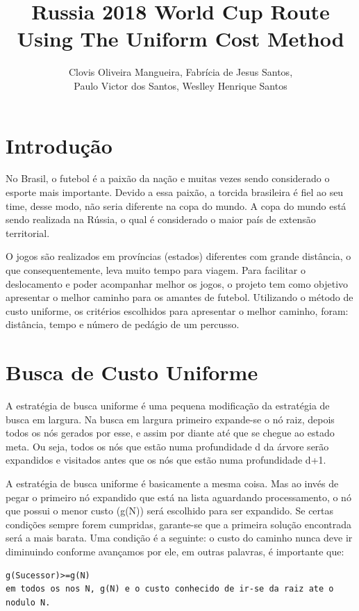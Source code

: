 \documentclass[12pt]{article}
\title{Russia 2018 World Cup Route Using The Uniform Cost Method}
\author{Clovis Oliveira Mangueira\inst{1}, Fabrícia de Jesus Santos\inst{1}, \\ Paulo Victor dos Santos\inst{1}, 	Weslley Henrique Santos\inst{1}}
\begin{document}
 

\maketitle

\section{Introdução}
No Brasil, o futebol é a paixão da nação e muitas vezes sendo considerado o esporte mais importante. Devido a essa paixão, a torcida brasileira é fiel ao seu time, desse modo, não seria diferente na copa do mundo. A copa do mundo está sendo realizada na Rússia, o qual é considerado o maior país de extensão territorial. 

O jogos são realizados em províncias (estados) diferentes com grande distância, o que consequentemente, leva muito tempo para viagem. Para facilitar o deslocamento e poder acompanhar melhor os jogos, o projeto tem como objetivo apresentar o melhor caminho para os amantes de futebol. Utilizando o método de custo uniforme, os critérios escolhidos para apresentar o melhor caminho, foram: distância, tempo e número de pedágio de um percusso.
\section{Busca de Custo Uniforme}
A estratégia de busca uniforme é uma pequena modificação da estratégia de busca em largura. Na busca em largura primeiro expande-se o nó raiz, depois todos os nós gerados por esse, e assim por diante até que se chegue ao estado meta. Ou seja, todos os nós que estão numa profundidade d da árvore serão expandidos e visitados antes que os nós que estão numa profundidade d+1.

A estratégia de busca uniforme é basicamente a mesma coisa. Mas ao invés de pegar o primeiro nó expandido que está na lista aguardando processamento, o nó que possui o menor custo (g(N)) será escolhido para ser expandido. Se certas condições sempre forem cumpridas, garante-se que a primeira solução encontrada será a mais barata. Uma condição é a seguinte: o custo do caminho nunca deve ir diminuindo conforme avançamos por ele, em outras palavras, é importante que:
\begin{lstlisting}[caption = Pseudo-código para calcular a função g(n)]
g(Sucessor)>=g(N)	
em todos os nos N, g(N) e o custo conhecido de ir-se da raiz ate o nodulo N.
\end{lstlisting}
\end{document}
